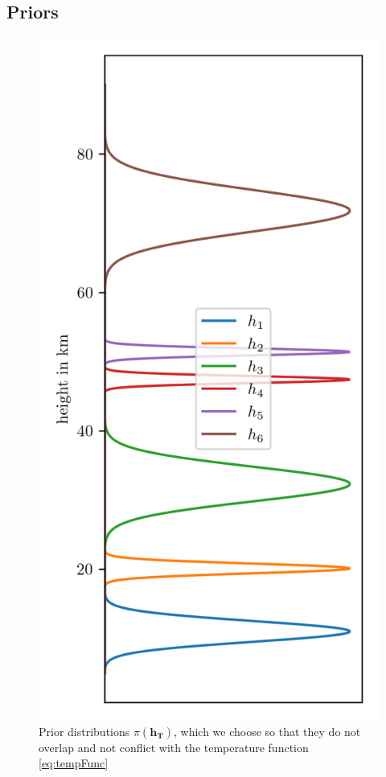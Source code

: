 \subsection{Priors}
\begin{figure}[ht!]
	\centering
	\includegraphics{HeightPriors.png}
	\caption[Prior distributions $\pi(\bm{h_T})$.]{Prior distributions $\pi(\bm{h_T})$, which we choose so that they do not overlap and not conflict with the temperature function \ref{eq:tempFunc}}
	\label{fig:HeightPriors}
\end{figure} 

